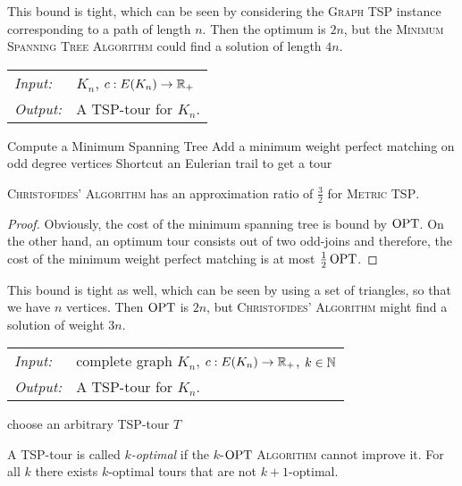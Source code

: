 \documentclass[../skript.tex]{subfiles}
\begin{document}
This bound is tight, which can be seen by considering the \textsc{Graph TSP} instance corresponding to a path of length $n$. Then the optimum is $2n$, but the \textsc{Minimum Spanning Tree Algorithm} could find a solution of length $4n$.
\begin{samepage}
\begin{algorithmbox}
\begin{tabular}{@{}ll}
\textit{Input:} & $K_n$, $c : E(K_n) \to \mathbb{R}_+$\\
\textit{Output:} & A TSP-tour for $K_n$.
\end{tabular}
\end{algorithmbox}
\vspace{-7pt}
\begin{algorithm}[H]
Compute a Minimum Spanning Tree\;
Add a minimum weight perfect matching on odd degree vertices\;
Shortcut an Eulerian trail to get a tour\;
\end{algorithm}
\vspace{-7pt}
\EndAlgorithmLine
\end{samepage}
\begin{theorem} %
\label{thm:88}
\textsc{Christofides' Algorithm} has an approximation ratio of $\frac{3}{2}$ for \textsc{Metric TSP}.
\end{theorem}
\begin{proof}
Obviously, the cost of the minimum spanning tree is bound by $\operatorname{OPT}$. On the other hand, an optimum tour consists out of two odd-joins and therefore, the cost of the minimum weight perfect matching is at most $\frac{1}{2} \operatorname{OPT}$.
\end{proof}
This bound is tight as well, which can be seen by using a set of triangles, so that we have $n$ vertices. Then $\operatorname{OPT}$ is $2n$, but \textsc{Christofides' Algorithm} might find a solution of weight $3n$.
\begin{samepage}
\begin{algorithmbox}
\begin{tabular}{@{}ll}
\textit{Input:} & complete graph $K_n$, $c : E(K_n) \to \mathbb{R}_+$, $k \in \mathbb{N}$\\
\textit{Output:} & A TSP-tour for $K_n$.
\end{tabular}
\end{algorithmbox}
\vspace{-7pt}
\begin{algorithm}[H]
choose an arbitrary TSP-tour $T$\;
\end{algorithm}
\vspace{-7pt}
\EndAlgorithmLine
\end{samepage}
A TSP-tour is called \emph{$k$-optimal} if the \textsc{$k$-$\operatorname{OPT}$ Algorithm} cannot improve it.
For all $k$ there exists $k$-optimal tours that are not $k+1$-optimal.
\end{document}
